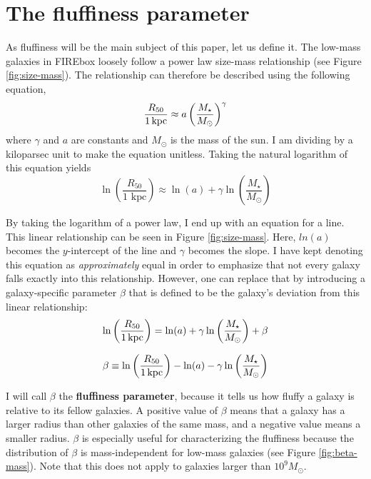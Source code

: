 \section{The fluffiness parameter}
As fluffiness will be the main subject of this paper, let us define it. The low-mass galaxies in FIREbox loosely follow a power law size-mass relationship (see Figure \ref{fig:size-mass}). The relationship can therefore be described using the following equation,
\begin{equation}
    \frac{R_{50}}{1 \rm{\,kpc}} \approx a
    \left(
        \frac{M_\star}{M_\odot}
    \right)
    ^{\gamma}
\end{equation}
where $\gamma$ and $a$ are constants and $M_\odot$ is the mass of the sun. I am dividing by a kiloparsec unit to make the equation unitless. Taking the natural logarithm of this equation yields
\begin{equation}
    \label{equ:linear-rel}
    \ln \left(
        \frac{R_{50}}{1 \text{ kpc}}
    \right)
    \approx
    \ln(a)
    + \gamma \ln \left(
        \frac{M_\star}{M_\odot}
    \right)
\end{equation}

By taking the logarithm of a power law, I end up with an equation for a line. This linear relationship can be seen in Figure \ref{fig:size-mass}. Here, $ln(a)$ becomes the $y$-intercept of the line and $\gamma$ becomes the slope. I have kept denoting this equation as \emph{approximately} equal in order to emphasize that not every galaxy falls exactly into this relationship. However, one can replace that by introducing a galaxy-specific parameter $\beta$ that is defined to be the galaxy's deviation from this linear relationship:
\begin{equation}
    \label{equ:log-log-with-beta}
    \ln \left(
        \frac{R_{50}}{1 \rm{\,kpc}}
    \right)
    =
    \ln(a)
    + \gamma \ln \left(
        \frac{M_\star}{M_\odot}
    \right)
    + \beta
\end{equation} 

\begin{equation}
    \label{equ:beta}
    \beta
    \equiv
    \ln \left(
        \frac{R_{50}}{1 \rm{\,kpc}}
    \right)
    -
    \ln(a)
    - \gamma \ln \left(
        \frac{M_\star}{M_\odot}
    \right)
\end{equation} 

I will call $\beta$ the \textbf{fluffiness parameter}, because it tells us how fluffy a galaxy is relative to its fellow galaxies. A positive value of $\beta$ means that a galaxy has a larger radius than other galaxies of the same mass, and a negative value means a smaller radius. $\beta$ is especially useful for characterizing the fluffiness because the distribution of $\beta$ is mass-independent for low-mass galaxies (see Figure \ref{fig:beta-mass}). Note that this does not apply to galaxies larger than $10^9 M_\odot$.


